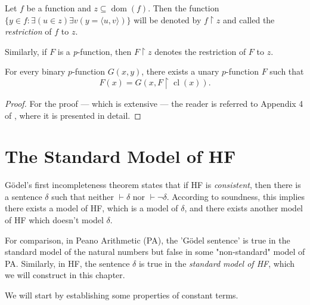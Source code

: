 \begin{definition}[Restriction]
    \label{def:IsFunc.restr+pFunc.restr}
    Let $f$ be a function and $z \subseteq \operatorname{dom}(f)$.
    Then the function $\{y \in f : \exists (u \in z) \exists v (y = \langle u,v \rangle)\}$
    will be denoted by $f \upharpoonright z$ and called the \textit{restriction} of $f$ to $z$.

    Similarly, if $F$ is a \textit{p}-function, then $F \upharpoonright z$ denotes the 
    restriction of $F$ to $z$.
\end{definition}

\begin{theorem}
    \label{thm:rank.exists_pFuncRecursive}
    For every binary $p$-function $G(x,y)$, there exists a unary $p$-function $F$ such that
    $$
    F(x) = G(x, F \upharpoonright \operatorname{cl}(x)).
    $$
\end{theorem}

\begin{proof}
    For the proof — which is extensive — the reader is referred to 
    Appendix 4 of \cite{swierczkowski2003finite}, where it is presented in detail.
\end{proof}



\chapter{The Standard Model of HF}

Gödel's first incompleteness theorem states that if HF is \textit{consistent}, 
then there is a sentence $\delta$ such that neither $\vdash \delta$ nor
$\vdash \neg\delta$. According to soundness, 
this implies there exists a model of HF, which is
a model of $\delta$, and there exists another model of HF which doesn't model $\delta$.

For comparison, in Peano Arithmetic (PA), the 'Gödel sentence' is true in the standard model of 
the natural numbers but false in some "non-standard" model of PA. 
Similarly, in HF, the sentence $\delta$ is true in the \textit{standard model of HF}, 
which we will construct in this chapter.

We will start by establishing some properties of constant terms.

